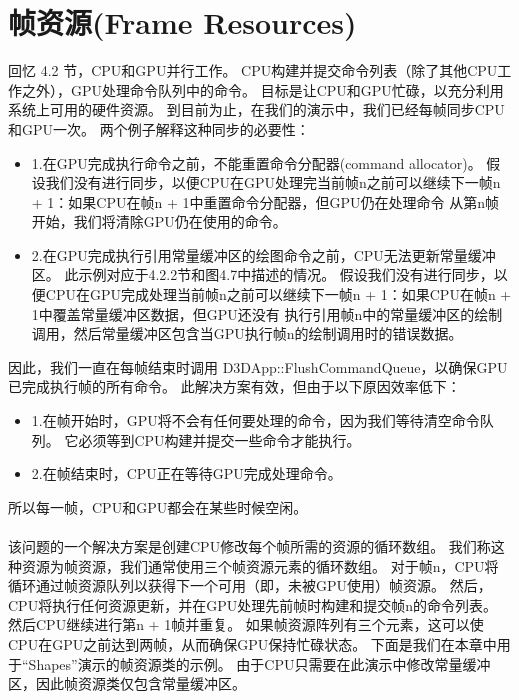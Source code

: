 \section{帧资源(Frame Resources)}
\begin{flushleft}
回忆 4.2 节，CPU和GPU并行工作。 CPU构建并提交命令列表（除了其他CPU工作之外），GPU处理命令队列中的命令。 目标是让CPU和GPU忙碌，以充分利用系统上可用的硬件资源。 到目前为止，在我们的演示中，我们已经每帧同步CPU和GPU一次。 两个例子解释这种同步的必要性：\\
\begin{itemize}
    \item 1.在GPU完成执行命令之前，不能重置命令分配器(command allocator)。 假设我们没有进行同步，以便CPU在GPU处理完当前帧n之前可以继续下一帧n + 1：如果CPU在帧n + 1中重置命令分配器，但GPU仍在处理命令 从第n帧开始，我们将清除GPU仍在使用的命令。
    \item 2.在GPU完成执行引用常量缓冲区的绘图命令之前，CPU无法更新常量缓冲区。 此示例对应于4.2.2节和图4.7中描述的情况。 假设我们没有进行同步，以便CPU在GPU完成处理当前帧n之前可以继续下一帧n + 1：如果CPU在帧n + 1中覆盖常量缓冲区数据，但GPU还没有 执行引用帧n中的常量缓冲区的绘制调用，然后常量缓冲区包含当GPU执行帧n的绘制调用时的错误数据。
\end{itemize}
因此，我们一直在每帧结束时调用 D3DApp::FlushCommandQueue，以确保GPU已完成执行帧的所有命令。 此解决方案有效，但由于以下原因效率低下：\\
\begin{itemize}
    \item 1.在帧开始时，GPU将不会有任何要处理的命令，因为我们等待清空命令队列。 它必须等到CPU构建并提交一些命令才能执行。
    \item 2.在帧结束时，CPU正在等待GPU完成处理命令。
\end{itemize}
所以每一帧，CPU和GPU都会在某些时候空闲。\\
~\\
该问题的一个解决方案是创建CPU修改每个帧所需的资源的循环数组。 我们称这种资源为帧资源，我们通常使用三个帧资源元素的循环数组。 对于帧n，CPU将循环通过帧资源队列以获得下一个可用（即，未被GPU使用）帧资源。 然后，CPU将执行任何资源更新，并在GPU处理先前帧时构建和提交帧n的命令列表。 然后CPU继续进行第n + 1帧并重复。 如果帧资源阵列有三个元素，这可以使CPU在GPU之前达到两帧，从而确保GPU保持忙碌状态。 下面是我们在本章中用于“Shapes”演示的帧资源类的示例。 由于CPU只需要在此演示中修改常量缓冲区，因此帧资源类仅包含常量缓冲区。\\
\end{flushleft}
